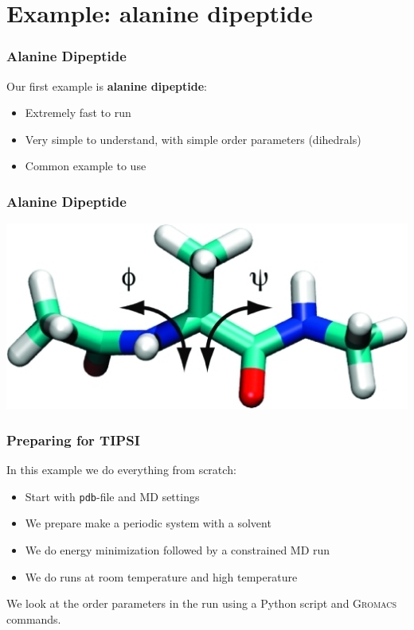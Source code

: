 \documentclass[hyperref={pdfpagelabels=false}]{beamer}
\begin{document}
\section{Example: alanine dipeptide} 
\setcounter{subsection}{1}

\begin{frame}
\frametitle{Alanine Dipeptide} 
Our first example is \textbf{alanine dipeptide}:
\begin{itemize}
\item Extremely fast to run
\item Very simple to understand, with simple order parameters (dihedrals)
\item Common example to use
\end{itemize}
\end{frame}

\begin{frame}
\frametitle{Alanine Dipeptide} 
\begin{center}
\includegraphics[scale=0.4]{images/alanine.png}
\end{center}
\end{frame}

\begin{frame}
\frametitle{Preparing for \textsc{TIPSI}} 
In this example we do everything from scratch:
\begin{itemize}
\item Start with \texttt{pdb}-file and MD settings
\item We prepare make a periodic system with a solvent
\item We do energy minimization followed by a constrained MD run
\item We do runs at room temperature and high temperature
\end{itemize}
We look at the order parameters in the run using a Python script and \textsc{Gromacs} commands.
\end{frame}
\end{document}
